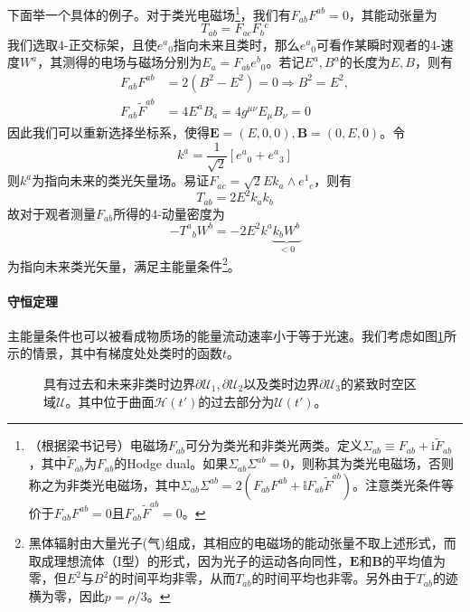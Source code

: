 \documentclass[hyperref, UTF8, a4paper]{ctexart}
\begin{document}
下面举一个具体的例子。对于类光电磁场\footnote{（根据梁书记号）电磁场$F_{ab}$可分为类光和非类光两类。定义$\Sigma _{ab} \equiv F_{ab} +\mathrm{i}\tilde{F}_{ab}$，其中$\tilde{F}_{ab}$为$F_{ab}$的Hodge dual。如果$\Sigma _{ab} \Sigma ^{ab} =0$，则称其为类光电磁场，否则称之为非类光电磁场，其中$\Sigma _{ab} \Sigma ^{ab} =2\left( F_{ab} F^{ab} +\mathbb{i} F_{ab}\tilde{F}^{ab}\right)$。注意类光条件等价于$F_{ab} F^{ab} =0$且$F_{ab}\tilde{F}^{ab} =0$。}，我们有$F_{ab} F^{ab} =0$，其能动张量为
\begin{equation*}
	T_{ab} =F_{ac} F{_{b}}^{c}
\end{equation*}
我们选取4-正交标架，且使$e^{a}{}_{0}$指向未来且类时，那么$e^{a}{}_{0}$可看作某瞬时观者的4-速度$W^{a}$，其测得的电场与磁场分别为$E_{a} =F_{ab} e^{b}{}_{0}$。若记$E^{a} ,B^{a}$的长度为$E,B$，则有
\begin{equation*}
	\begin{aligned}
		F_{ab} F^{ab} & =2\left( B^{2} -E^{2}\right) =0\Rightarrow B^{2} =E^{2} ,\\
		F_{ab}\tilde{F}^{ab} & =4E^{a} B_{a} =4g^{\mu \nu } E_{\mu } B_{\nu } =0
	\end{aligned}
\end{equation*}
因此我们可以重新选择坐标系，使得$\boldsymbol{E} =( E,0,0) ,\boldsymbol{B} =( 0,E,0)$。令
\begin{equation*}
	k^{a} =\frac{1}{\sqrt{2}}\left[ e^{a}{}_{0} +e^{a}{}_{3}\right]
\end{equation*}
则$k^{a}$为指向未来的类光矢量场。易证$F_{ac} =\sqrt{2} Ek_{a} \land e^{1}{}_{c}$，则有
\begin{equation*}
	T_{ab} =2E^{2} k_{a} k_{b}
\end{equation*}
故对于观者测量$F_{ab}$所得的4-动量密度为
\begin{equation*}
	-T^{a}{}_{b} W^{b} =-2E^{2} k^{a}\underbrace{k_{b} W^{b}}_{< 0}
\end{equation*}
为指向未来类光矢量，满足主能量条件\footnote{黑体辐射由大量光子(气)组成，其相应的电磁场的能动张量不取上述形式，而取成理想流体（I型）的形式，因为光子的运动各向同性，$\boldsymbol{E}$和$\boldsymbol{B}$的平均值为零，但$E^{2}$与$B^{2}$的时间平均非零，从而$T_{ab}$的时间平均也非零。另外由于$T_{ab}$的迹横为零，因此$p=\rho /3$。}。
\paragraph{守恒定理}

主能量条件也可以被看成物质场的能量流动速率小于等于光速。我们考虑如图\ref{fig:constant_theorem}所示的情景，其中有梯度处处类时的函数$t$。
\begin{figure}
	\centering
	
	
	
	\caption{具有过去和未来非类时边界$\partial \mathscr{U}_{1} ,\partial \mathscr{U}_{2}$以及类时边界$\partial \mathscr{U}_{3}$的紧致时空区域$\mathscr{U}$。其中位于曲面$\mathscr{H}( t')$的过去部分为$\mathscr{U}( t')$。}
	
	\label{fig:constant_theorem}
\end{figure}
\end{document}

